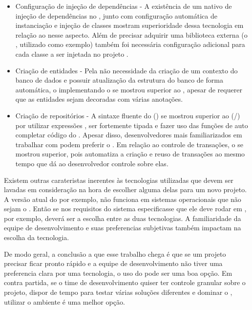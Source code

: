 \begin{itemize}
  \item Configuração de injeção de dependências - A existência de um  nativo de injeção de dependências no , junto com configuração automática de instanciação e injeção de classes mostram superioridade dessa tecnologia em relação ao  nesse aspecto. Além de precisar adquirir uma biblioteca externa (o , utilizado como exemplo) também foi necessária configuração adicional para cada classe a ser injetada no projeto .
  \item Criação de entidades - Pela não necessidade da criação de um contexto do banco de dados e possuir atualização da estrutura do banco de forma automática, o  implementando o  se mostrou superior ao , apesar de requerer que as entidades sejam decoradas com várias anotações.
  \item Criação de repositórios - A sintaxe fluente do  () se mostrou superior ao  (/) por utilizar expressões , ser fortemente tipada e fazer uso das funções de auto completar código do . Apesar disso, desenvolvedores mais familiarizados em trabalhar com   podem preferir o . Em relação ao controle de transações, o  se mostrou superior, pois automatiza a criação e reuso de transações ao mesmo tempo que dá ao desenvolvedor controle sobre elas. 
\end{itemize}

Existem outras carateristas inerentes às tecnologias utilizadas que devem ser lavadas em consideração na hora de escolher alguma delas para um novo projeto. A versão atual do  por exemplo, não funciona em sistemas operacionais que não sejam o . Então se nos requisitos do sistema especificasse que ele deve rodar em , por exemplo,  deverá ser a escolha entre as duas tecnologias. A familiaridade da equipe de desenvolvimento e suas preferencias subjetivas também impactam na escolha da tecnologia.

De modo geral, a conclusão a que esse trabalho chega é que se um projeto precisar ficar pronto rápido e a equipe de desenvolvimento não tiver uma preferencia clara por uma tecnologia, o uso do  pode ser uma boa opção. Em contra partida, se o time de desenvolvimento quiser ter controle granular sobre o projeto, dispor de tempo para testar várias soluções diferentes e dominar o , utilizar o ambiente  é uma melhor opção.

